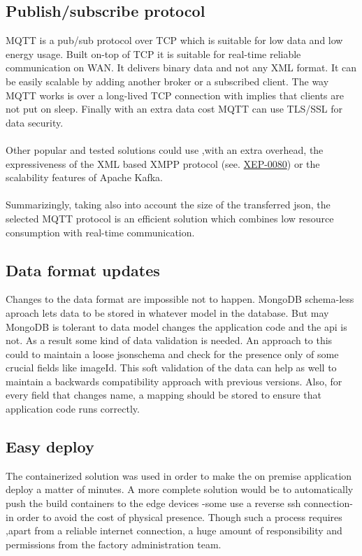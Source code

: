 \documentclass[a4paper,10pt]{article}
\begin{document}
\subsection{Publish/subscribe protocol}
MQTT is a pub/sub protocol over TCP which is suitable for low data and low energy usage.
Built on-top of TCP it is suitable for real-time reliable communication on WAN. It delivers
binary data and not any XML format. It can be easily scalable by adding another broker or a subscribed
client. The way MQTT works is over a long-lived TCP connection with implies that clients are not put on sleep.
Finally with an extra data cost MQTT can use TLS/SSL for data security.\\
\\
Other popular and tested solutions could use ,with an extra overhead, the expressiveness of the XML based
XMPP protocol (see. \href{https://xmpp.org/extensions/xep-0080.html}{XEP-0080}) or the scalability features
of Apache Kafka.\\
\\
Summarizingly, taking also into account the size of the transferred json, the selected MQTT protocol is an
efficient solution which combines low resource consumption with real-time communication.

\subsection{Data format updates}
Changes to the data format are impossible not to happen. MongoDB schema-less aproach lets data to be stored in whatever
model in the database. But may MongoDB is tolerant to data model changes the application code and the api is not. As a result
some kind of data validation is needed. An approach to this could to maintain a loose jsonschema and check for the presence
only of some crucial fields like imageId. This soft validation of the data can help as well to maintain a backwards compatibility
approach with previous versions. Also, for every field that changes name, a mapping should be stored to ensure that application
code runs correctly.

\subsection{Easy deploy}
The containerized solution was used in order to make the on premise application deploy a matter of minutes. A more
complete solution would be to automatically push the build containers  to the edge devices -some use a reverse ssh connection-
in order to avoid the cost of physical presence. Though such a process requires ,apart from a reliable internet connection,
a huge amount of responsibility and permissions from the factory administration team.
\end{document}
